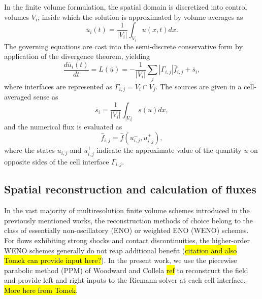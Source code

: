 \documentclass[]{article}
\begin{document}
    In the finite volume formulation, the spatial domain is discretized into
    control volumes $V_{i}$, inside which the solution is approximated by volume
    averages as
    \begin{equation}
        \overline{u}_{i}(t) = \frac{1}{|V_{i}|} \int_{V_{i}} u(x,t) dx.
    \end{equation}
    The governing equations are cast into the semi-discrete conservative form
    by application of the divergence theorem, yielding
    \begin{equation}
        \frac{d \overline{u}_{i}(t)}{dt} = L(\overline{u}) =  -\frac{1}{|V_{i}|} \sum_{j} |
        \Gamma_{i,j}| \hat{f}_{i,j}
        + \overline{s}_{i},
        \label{ode}
    \end{equation}
    where interfaces are represented as $\Gamma_{i,j} = V_{i} \cap
    V_{j}$. The sources are given in a cell-averaged sense as
    \begin{equation}
        \overline{s}_{i} = \frac{1}{|V_{i}|} \int_{|V_{i}|} s(u) dx,
    \end{equation}
    and the numerical flux is evaluated as
    \begin{equation}
        \hat{f}_{i,j} = \hat{f}(u^{-}_{i,j}, u^{+}_{i,j}),
    \end{equation}
    where the states $u^{-}_{i,j}$ and $u^{+}_{i,j}$ indicate the approximate
    value of the quantity $u$ on opposite sides of the cell
    interface $\Gamma_{i,j}$.


    \subsection{Spatial reconstruction and calculation of fluxes}

        In the vast majority of multiresolution finite volume schemes
        introduced in the previously mentioned works, the reconstruction
        methods of choice belong to the class of essentially non-oscillatory
        (ENO) or weighted ENO (WENO) schemes. For flows exhibiting strong
        shocks and contact discontinuities, the higher-order WENO schemes
        generally do not reap additional benefit (\hl{citation and also Tomek
        can provide input here?}). In the present work, we use the piecewise
        parabolic method (PPM) of Woodward and Collela \hl{ref} to reconstruct
        the field and provide left and right inputs to the Riemann solver at
        each cell interface. \hl{More here from Tomek}.
\end{document}
